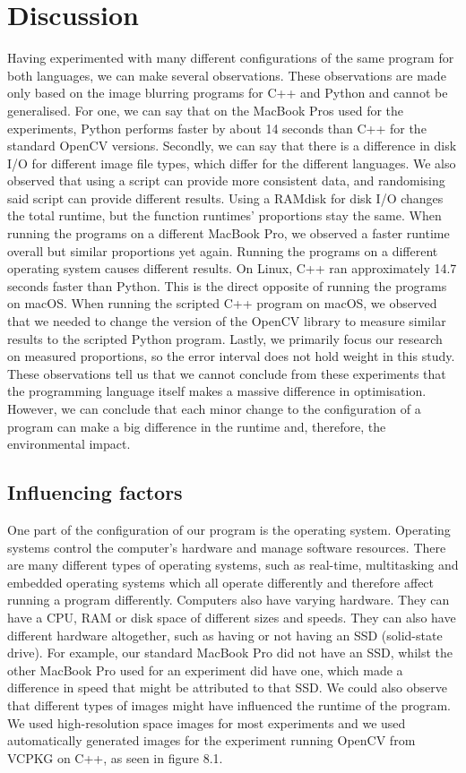 \chapter{Discussion}
Having experimented with many different configurations of the same program for both languages, we can make several observations. These observations are made only based on the image blurring programs for C++ and Python and cannot be generalised.
For one, we can say that on the MacBook Pros used for the experiments, Python performs faster by about 14 seconds than C++ for the standard OpenCV versions. Secondly, we can say that there is a difference in disk I/O for different image file types, which differ for the different languages. We also observed that using a script can provide more consistent data, and randomising said script can provide different results. Using a RAMdisk for disk I/O changes the total runtime, but the function runtimes' proportions stay the same. When running the programs on a different MacBook Pro, we observed a faster runtime overall but similar proportions yet again. Running the programs on a different operating system causes different results. On Linux, C++ ran approximately 14.7 seconds faster than Python. This is the direct opposite of running the programs on macOS. When running the scripted C++ program on macOS, we observed that we needed to change the version of the OpenCV library to measure similar results to the scripted Python program. Lastly, we primarily focus our research on measured proportions, so the error interval does not hold weight in this study.
These observations tell us that we cannot conclude from these experiments that the programming language itself makes a massive difference in optimisation. However, we can conclude that each minor change to the configuration of a program can make a big difference in the runtime and, therefore, the environmental impact.

\section{Influencing factors}
One part of the configuration of our program is the operating system. Operating systems control the computer’s hardware and manage software resources. There are many different types of operating systems, such as real-time, multitasking and embedded operating systems which all operate differently and therefore affect running a program differently.
Computers also have varying hardware. They can have a CPU, RAM or disk space of different sizes and speeds. They can also have different hardware altogether, such as having or not having an SSD (solid-state drive). For example, our standard MacBook Pro did not have an SSD, whilst the other MacBook Pro used for an experiment did have one, which made a difference in speed that might be attributed to that SSD.
We could also observe that different types of images might have influenced the runtime of the program. We used high-resolution space images for most experiments and we used automatically generated images for the experiment running OpenCV from VCPKG on C++, as seen in figure 8.1.

